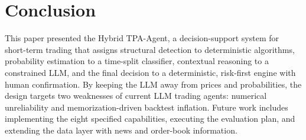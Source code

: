 \documentclass[conference]{IEEEtran}
\begin{document}
\section{Conclusion}\label{sec:conclusion}

This paper presented the Hybrid TPA-Agent, a decision-support system for short-term trading that assigns structural detection to deterministic algorithms, probability estimation to a time-split classifier, contextual reasoning to a constrained LLM, and the final decision to a deterministic, risk-first engine with human confirmation. By keeping the LLM away from prices and probabilities, the design targets two weaknesses of current LLM trading agents: numerical unreliability and memorization-driven backtest inflation. Future work includes implementing the eight specified capabilities, executing the evaluation plan, and extending the data layer with news and order-book information.



\end{document}

